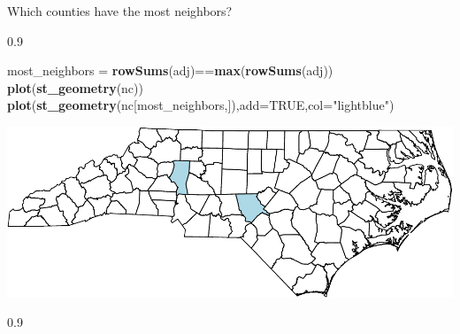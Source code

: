 \documentclass[11pt,ignorenonframetext,]{beamer}
\newenvironment{Shaded}{}{}
\newcommand{\KeywordTok}[1]{\textcolor[rgb]{0.00,0.44,0.13}{\textbf{#1}}}
\newcommand{\DataTypeTok}[1]{\textcolor[rgb]{0.56,0.13,0.00}{#1}}
\newcommand{\StringTok}[1]{\textcolor[rgb]{0.25,0.44,0.63}{#1}}
\newcommand{\OtherTok}[1]{\textcolor[rgb]{0.00,0.44,0.13}{#1}}
\newcommand{\OperatorTok}[1]{\textcolor[rgb]{0.40,0.40,0.40}{#1}}
\newcommand{\NormalTok}[1]{#1}
\let\oldShaded\Shaded
\let\endoldShaded\endShaded
\renewenvironment{Shaded}{\footnotesize\begin{spacing}{0.9}\oldShaded}{\endoldShaded\end{spacing}}
\begin{document}
\begin{frame}[fragile]{Which counties have the most neighbors?}

\begin{Shaded}
\begin{Highlighting}[]
\NormalTok{most_neighbors =}\StringTok{ }\KeywordTok{rowSums}\NormalTok{(adj)}\OperatorTok{==}\KeywordTok{max}\NormalTok{(}\KeywordTok{rowSums}\NormalTok{(adj)) }
\KeywordTok{plot}\NormalTok{(}\KeywordTok{st_geometry}\NormalTok{(nc))}
\KeywordTok{plot}\NormalTok{(}\KeywordTok{st_geometry}\NormalTok{(nc[most_neighbors,]),}\DataTypeTok{add=}\OtherTok{TRUE}\NormalTok{,}\DataTypeTok{col=}\StringTok{"lightblue"}\NormalTok{)}
\end{Highlighting}
\end{Shaded}

\begin{center}\includegraphics{Lec16_files/figure-beamer/unnamed-chunk-34-1} \end{center}

\begin{Shaded}
\end{Shaded}

\end{frame}
\end{document}
